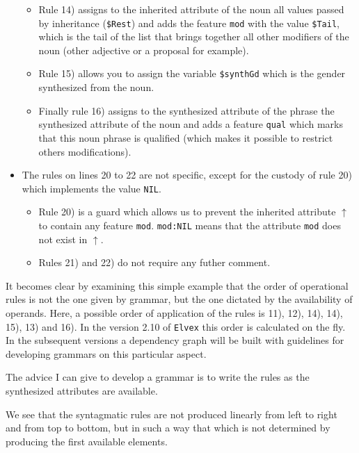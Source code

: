 \documentclass[11pt]{article}
\begin{document}
\begin{itemize}
\begin{itemize}
  \item Rule 14) assigns to the inherited attribute of the noun all
    values passed by inheritance (\verb#$Rest#) and adds the feature
    \verb#mod# with the value
    \verb#$Tail#, which is the tail of the list that brings together
    all other modifiers of the noun (other adjective or a proposal for
    example).
    
  \item Rule 15) allows you to assign the variable
    \verb#$synthGd# which is the gender synthesized from the noun.
    
  \item Finally rule 16) assigns to the synthesized attribute of the
    phrase the synthesized attribute of the noun and adds a feature
    \texttt{qual} which marks that this noun phrase is qualified
    (which makes it possible to restrict others modifications).
    
\end{itemize}

\item The rules on lines 20 to 22 are not specific, except for the
  custody of rule 20) which implements the value \verb#NIL#.

  \begin{itemize}    
  \item Rule 20) is a guard which allows us to prevent the inherited
    attribute $\uparrow$ to contain any feature
    \texttt{mod}. \verb#mod:NIL# means that the attribute \verb#mod#
    does not exist in $\uparrow$.
    
  \item Rules 21) and 22) do not require any futher comment.

  \end{itemize}
\end{itemize}

It becomes clear by examining this simple example that the order of
operational rules is not the one given by grammar, but the one
dictated by the availability of operands. Here, a possible order of
application of the rules is 11), 12), 14), 14), 15), 13) and 16). In
the version 2.10 of \texttt{Elvex} this order is calculated on the
fly. In the subsequent versions a dependency graph will be built with
guidelines for developing grammars on this particular aspect.

The advice I can give to develop a grammar is
to write the rules as the synthesized attributes are available.

We see that the syntagmatic rules are not produced
linearly from left to right and from top to bottom, but in such a way that
which is not determined by producing the first available elements.
\end{document}
